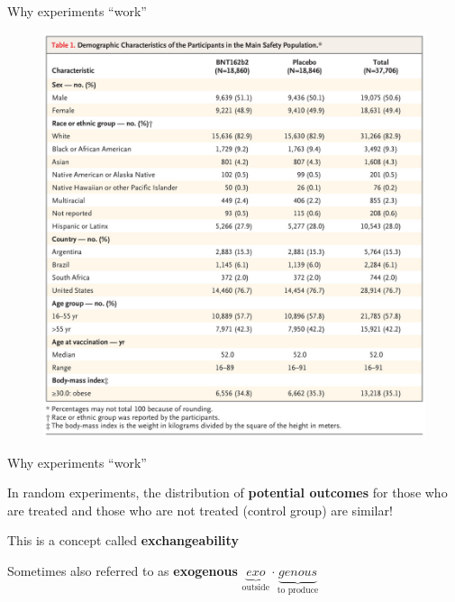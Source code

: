 \documentclass{beamer}
\begin{document}
\begin{frame}{Why experiments ``work''}

\begin{figure}
    \centering
    \includegraphics[scale = .18]{figures/pfizer_balance.jpg}
\end{figure}

\end{frame}



\begin{frame}{Why experiments ``work''}

In random experiments, the distribution of \textbf{potential outcomes} for those who are treated and those who are not treated (control group) are similar!

\pause
\vspace{2em}
This is a concept called \textbf{exchangeability}
\pause

\vspace{1em}
Sometimes also referred to as \textbf{exogenous}\hspace{1cm} $\underbrace{exo}_{\text{outside}} \cdot \underbrace{genous}_{\text{to produce}}$


\end{frame}
\end{document}
